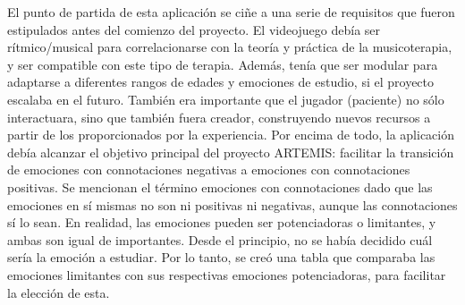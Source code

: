 El punto de partida de esta aplicación se ciñe a una serie de requisitos que fueron estipulados antes del comienzo del proyecto. El videojuego debía ser rítmico/musical para correlacionarse con la teoría y práctica de la musicoterapia, y ser compatible con este tipo de terapia. Además, tenía que ser modular para adaptarse a diferentes rangos de edades y emociones de estudio, si el proyecto escalaba en el futuro. También era importante que el jugador (paciente) no sólo interactuara, sino que también fuera creador, construyendo nuevos recursos a partir de los proporcionados por la experiencia. Por encima de todo, la aplicación debía alcanzar el objetivo principal del proyecto ARTEMIS: facilitar la transición de emociones con connotaciones negativas a emociones con connotaciones positivas. Se mencionan el término emociones con connotaciones dado que las emociones en sí mismas no son ni positivas ni negativas, aunque las connotaciones sí lo sean. En realidad, las emociones pueden ser potenciadoras o limitantes, y ambas son igual de importantes. Desde el principio, no se había decidido cuál sería la emoción a estudiar. Por lo tanto, se creó una tabla que comparaba las emociones limitantes con sus respectivas emociones potenciadoras, para facilitar la elección de esta.

